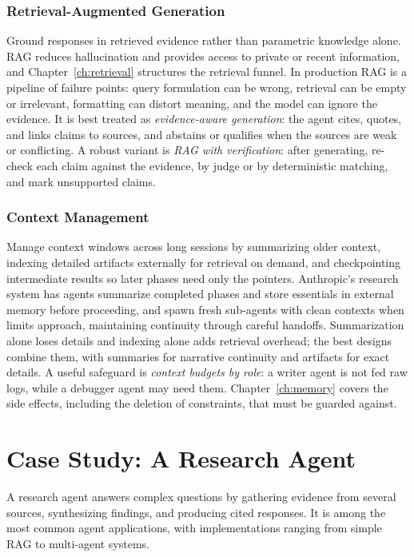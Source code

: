\documentclass[11pt]{book}
\begin{document}
\subsubsection{Retrieval-Augmented Generation}

Ground responses in retrieved evidence rather than parametric knowledge alone. RAG reduces hallucination and provides access to private or recent information, and Chapter~\ref{ch:retrieval} structures the retrieval funnel. In production RAG is a pipeline of failure points: query formulation can be wrong, retrieval can be empty or irrelevant, formatting can distort meaning, and the model can ignore the evidence. It is best treated as \textit{evidence-aware generation}: the agent cites, quotes, and links claims to sources, and abstains or qualifies when the sources are weak or conflicting. A robust variant is \textit{RAG with verification}: after generating, re-check each claim against the evidence, by judge or by deterministic matching, and mark unsupported claims.

\subsubsection{Context Management}

Manage context windows across long sessions by summarizing older context, indexing detailed artifacts externally for retrieval on demand, and checkpointing intermediate results so later phases need only the pointers. Anthropic's research system \cite{anthropicresearch2025} has agents summarize completed phases and store essentials in external memory before proceeding, and spawn fresh sub-agents with clean contexts when limits approach, maintaining continuity through careful handoffs. Summarization alone loses details and indexing alone adds retrieval overhead; the best designs combine them, with summaries for narrative continuity and artifacts for exact details. A useful safeguard is \textit{context budgets by role}: a writer agent is not fed raw logs, while a debugger agent may need them. Chapter~\ref{ch:memory} covers the side effects, including the deletion of constraints, that must be guarded against.

\section{Case Study: A Research Agent}

A research agent answers complex questions by gathering evidence from several sources, synthesizing findings, and producing cited responses. It is among the most common agent applications, with implementations ranging from simple RAG to multi-agent systems.
\end{document}
